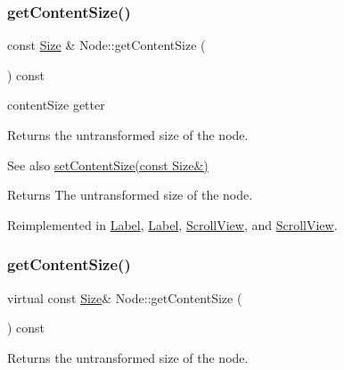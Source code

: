\subsubsection{\texorpdfstring{get\+Content\+Size()}{getContentSize()}\hspace{0.1cm}{\footnotesize\ttfamily [1/2]}}
{\footnotesize\ttfamily const \hyperlink{classSize}{Size} \& Node\+::get\+Content\+Size (\begin{DoxyParamCaption}{ }\end{DoxyParamCaption}) const\hspace{0.3cm}{\ttfamily [virtual]}}



content\+Size getter 

Returns the untransformed size of the node.

\begin{DoxySeeAlso}{See also}
{\ttfamily \hyperlink{classNode_ade113d7fc9244f58ac98a4712da49818}{set\+Content\+Size(const Size\&)}}
\end{DoxySeeAlso}
\begin{DoxyReturn}{Returns}
The untransformed size of the node. 
\end{DoxyReturn}


Reimplemented in \hyperlink{classLabel_a6ff9d78705856ffaf4b5258682e1df00}{Label}, \hyperlink{classLabel_a3b571f804249bde9c8d8a5b4bb067d3f}{Label}, \hyperlink{classScrollView_a996456628c049a6cc2876a7b18d15648}{Scroll\+View}, and \hyperlink{classScrollView_a137f08e58505c253a4c3274c426200b2}{Scroll\+View}.

\mbox{\label{classNode_a7f2f3f01d27d07883359139fce9d628a}} 
\subsubsection{\texorpdfstring{get\+Content\+Size()}{getContentSize()}\hspace{0.1cm}{\footnotesize\ttfamily [2/2]}}
{\footnotesize\ttfamily virtual const \hyperlink{classSize}{Size}\& Node\+::get\+Content\+Size (\begin{DoxyParamCaption}{ }\end{DoxyParamCaption}) const\hspace{0.3cm}{\ttfamily [virtual]}}

Returns the untransformed size of the node.

